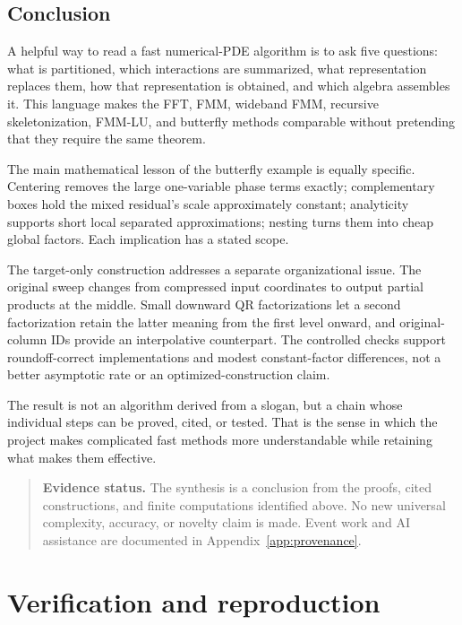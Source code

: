 \documentclass[11pt,a4paper]{article}
\newenvironment{evidence}{\begin{quote}\small\color{muted}\textbf{Evidence status.} }{\end{quote}}
\begin{document}
\subsection{Conclusion}
A helpful way to read a fast numerical-PDE algorithm is to ask five questions: what is partitioned, which interactions are summarized, what representation replaces them, how that representation is obtained, and which algebra assembles it. This language makes the FFT, FMM, wideband FMM, recursive skeletonization, FMM-LU, and butterfly methods comparable without pretending that they require the same theorem.

The main mathematical lesson of the butterfly example is equally specific. Centering removes the large one-variable phase terms exactly; complementary boxes hold the mixed residual's scale approximately constant; analyticity supports short local separated approximations; nesting turns them into cheap global factors. Each implication has a stated scope.

The target-only construction addresses a separate organizational issue. The original sweep changes from compressed input coordinates to output partial products at the middle. Small downward QR factorizations let a second factorization retain the latter meaning from the first level onward, and original-column IDs provide an interpolative counterpart. The controlled checks support roundoff-correct implementations and modest constant-factor differences, not a better asymptotic rate or an optimized-construction claim.

The result is not an algorithm derived from a slogan, but a chain whose individual steps can be proved, cited, or tested. That is the sense in which the project makes complicated fast methods more understandable while retaining what makes them effective.
\begin{evidence}
The synthesis is a conclusion from the proofs, cited constructions, and finite computations identified above. No new universal complexity, accuracy, or novelty claim is made. Event work and AI assistance are documented in Appendix~\ref{app:provenance}.
\end{evidence}

\appendix
\section{Verification and reproduction}
\label{app:verification}
\end{document}
